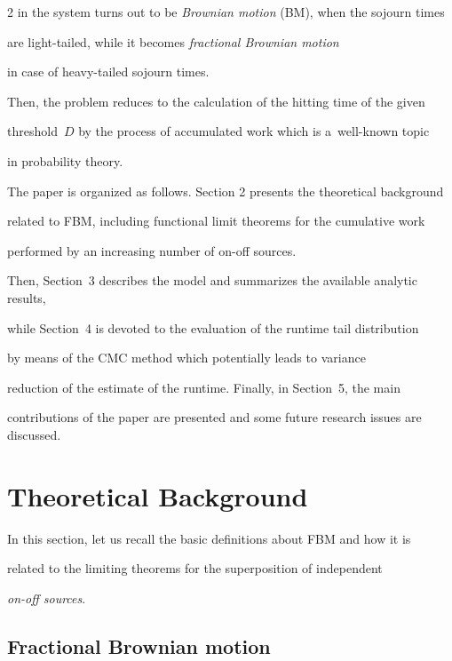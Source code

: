 \begin{multicols}{2}
in the system turns out to be \textit{Brownian motion} (BM), when the sojourn times 

are light-tailed, while it becomes \textit{fractional Brownian motion} 

in case of heavy-tailed sojourn times.  

Then, the problem reduces to the calculation of the hitting time of the given

 threshold~$D$ by the process of accumulated work which is a~well-known topic 

 in probability theory.



The paper is organized as follows. Section 2 presents the theoretical background 

related to  FBM, including functional limit theorems for the cumulative  work 

performed  by an increasing  number of on-off sources.    

Then, Section~3 describes the model and summarizes the available analytic results, 

while Section~4 is devoted to the evaluation of the runtime tail distribution 

by means of the CMC method which potentially leads to variance 

reduction of the estimate of the runtime. Finally, in Section~5, the main 

contributions of the paper are presented and some future research issues are discussed. 



\section{Theoretical Background}



\noindent

In this section, let us recall the basic definitions about FBM and how it is 

related to the limiting theorems for the superposition of independent 

\textit{on-off sources}.



\subsection{Fractional Brownian motion}



\noindent


\end{multicols}
